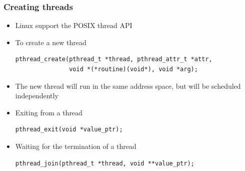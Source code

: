 \begin{frame}[fragile]
  \frametitle{Creating threads}
  \begin{itemize}
  \item Linux support the POSIX thread API
  \item To create a new thread
    \begin{block}{}
\small
\begin{verbatim}
pthread_create(pthread_t *thread, pthread_attr_t *attr,
               void *(*routine)(void*), void *arg);
\end{verbatim}
\normalsize
    \end{block}
  \item The new thread will run in the same address space, but will be
    scheduled independently
  \item Exiting from a thread
    \begin{block}{}
\small
\begin{verbatim}
pthread_exit(void *value_ptr);
\end{verbatim}
\normalsize
    \end{block}
  \item Waiting for the termination of a thread
    \begin{block}{}
\small
\begin{verbatim}
pthread_join(pthread_t *thread, void **value_ptr);
\end{verbatim}
\normalsize
    \end{block}
  \end{itemize}
\end{frame}

